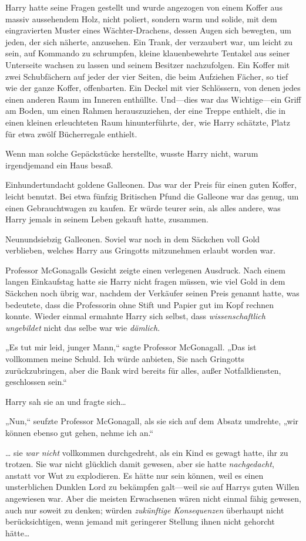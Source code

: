 {Harry hatte seine Fragen gestellt und wurde angezogen von einem Koffer aus massiv aussehendem Holz, nicht poliert, sondern warm und solide, mit dem eingravierten Muster eines Wächter-Drachens, dessen Augen sich bewegten, um jeden, der sich näherte, anzusehen. Ein Trank, der verzaubert war, um leicht zu sein, auf Kommando zu schrumpfen, kleine klauenbewehrte Tentakel aus seiner Unterseite wachsen zu lassen und seinem Besitzer nachzufolgen. Ein Koffer mit zwei Schubfächern auf jeder der vier Seiten, die beim Aufziehen Fächer, so tief wie der ganze Koffer, offenbarten. Ein Deckel mit vier Schlössern, von denen jedes einen anderen Raum im Inneren enthüllte. Und—dies war das Wichtige—ein Griff am Boden, um einen Rahmen herauszuziehen, der eine Treppe enthielt, die in einen kleinen erleuchteten Raum hinunterführte, der, wie Harry schätzte, Platz für etwa zwölf Bücherregale enthielt.

Wenn man solche Gepäckstücke herstellte, wusste Harry nicht, warum irgendjemand ein Haus besaß.

Einhundertundacht goldene Galleonen. Das war der Preis für einen guten Koffer, leicht benutzt. Bei etwa fünfzig Britischen Pfund die Galleone war das genug, um einen Gebrauchtwagen zu kaufen. Er würde teurer sein, als alles andere, was Harry jemals in seinem Leben gekauft hatte, zusammen.

Neunundsiebzig Galleonen. Soviel war noch in dem Säckchen voll Gold verblieben, welches Harry aus Gringotts mitzunehmen erlaubt worden war.

Professor McGonagalls Gesicht zeigte einen verlegenen Ausdruck. Nach einem langen Einkaufstag hatte sie Harry nicht fragen müssen, wie viel Gold in dem Säckchen noch übrig war, nachdem der Verkäufer seinen Preis genannt hatte, was bedeutete, dass die Professorin ohne Stift und Papier gut im Kopf rechnen konnte. Wieder einmal ermahnte Harry sich selbst, dass \emph{wissenschaftlich ungebildet} nicht das selbe war wie \emph{dämlich}.

„Es tut mir leid, junger Mann,“ sagte Professor McGonagall. „Das ist vollkommen meine Schuld. Ich würde anbieten, Sie nach Gringotts zurückzubringen, aber die Bank wird bereits für alles, außer Notfalldiensten, geschlossen sein.“

Harry sah sie an und fragte sich…

„Nun,“ seufzte Professor McGonagall, als sie sich auf dem Absatz umdrehte, „wir können ebenso gut gehen, nehme ich an.“

… sie \emph{war nicht} vollkommen durchgedreht, als ein Kind es gewagt hatte, ihr zu trotzen. Sie war nicht glücklich damit gewesen, aber sie hatte \emph{nachgedacht}, anstatt vor Wut zu explodieren. Es hätte nur sein können, weil es einen unsterblichen Dunklen Lord zu bekämpfen galt—weil sie auf Harrys guten Willen angewiesen war. Aber die meisten Erwachsenen wären nicht einmal fähig gewesen, auch nur soweit zu denken; würden \emph{zukünftige Konsequenzen} überhaupt nicht berücksichtigen, wenn jemand mit geringerer Stellung ihnen nicht gehorcht hätte…

}
